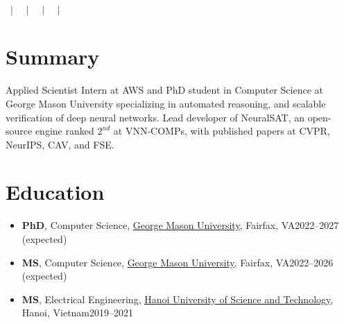 \documentclass[11pt]{article}
\begin{document}
\thispagestyle{empty}

\begin{center}
    {\bfseries\Huge \myname{}}\\[0.6ex]
    {\small \myaddress ~$\vert$~ \myphone ~$\vert$~ \myemailwork ~$\vert$~ \mywebsite ~$\vert$~ \mygooglescholar}
\end{center}

\section{Summary}
    Applied Scientist Intern at AWS and PhD student in Computer Science at George Mason University specializing in
    automated reasoning, and scalable verification of deep neural networks.
    Lead developer of NeuralSAT, an open-source engine ranked $2^{nd}$ at VNN-COMPs, with published papers at
    CVPR, NeurIPS, CAV, and FSE. 

\section{Education}
    \begin{itemize}
        \item \textbf{PhD}, Computer Science, \href{https://www.gmu.edu}{George Mason University}, Fairfax, VA\hfill 2022--2027 (expected)
        \item \textbf{MS}, Computer Science, \href{https://www.gmu.edu}{George Mason University}, Fairfax, VA\hfill 2022--2026 (expected)
        \item \textbf{MS}, Electrical Engineering, \href{https://www.hust.edu.vn/en/}{Hanoi University of Science and Technology}, Hanoi, Vietnam\hfill 2019--2021
    \end{itemize}
\end{document}
